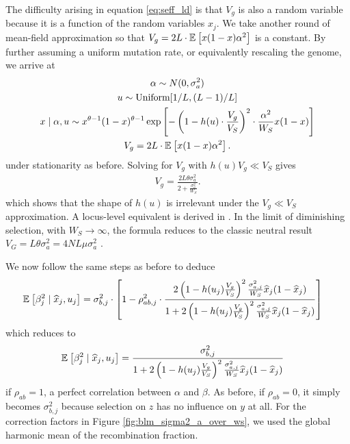 \documentclass[10pt]{article}
\begin{document}
The difficulty arising in equation \eqref{eq:seff_ld} is that $V_g$ is also a random variable because it is a function of the random variables $x_j$.
We take another round of mean-field approximation so that $V_g = 2L \cdot \mathbb{E}_{}\left[x(1-x)\alpha^2\right]$ is a constant.
By further assuming a uniform mutation rate, or equivalently rescaling the genome,
we arrive at
\begin{gather}
    \begin{gathered}
        \alpha \sim N(0, \sigma_a^2) \\
        u \sim \mathrm{Uniform}[1/L,(L-1)/L] \\
        x \mid \alpha, u \sim x^{\theta-1}(1-x)^{\theta-1}
        \exp\left[
            - \left(
            1- h(u) \cdot \frac{V_g}{V_S}
            \right)^2 \cdot 
            \frac{\alpha^2}{W_S}
            x(1-x)
        \right] \\
        V_g = 2L \cdot \mathbb{E}_{}\left[x(1-x)\alpha^2\right].
    \end{gathered}
\end{gather}
under stationarity as before.
Solving for $V_g$ with $h(u) V_g \ll V_S$ gives
\begin{align}
    V_g = \frac{2L\theta \sigma_a^2}{2 + \frac{\sigma_a^2}{W_S}}.
\end{align}
which shows that the shape of $h(u)$ is irrelevant under the $V_g \ll V_S$ approximation.
A locus-level equivalent is derived in \citet{Keightley_1988}.
In the limit of diminishing selection, with $W_S \rightarrow \infty$, the formula reduces to the classic neutral result $V_G = L\theta\sigma_a^2 = 4NL\mu\sigma_a^2$ \citep{Lynch_1986}.

We now follow the same steps as before to deduce
\begin{align} \label{eq:arch_final}
    \begin{aligned}
        \mathbb{E}_{}\left[\beta_j^2 \mid \widehat{x}_j, u_j\right]
    &= \sigma_{b,j}^2 \cdot 
    \left[
    1 - 
    \rho_{ab,j}^2 \cdot 
        \frac{
             2\left(1-h(u_j)\frac{V_g}{V_S}\right)^2\frac{\sigma_{a,j}^2}{W_S} \widehat{x}_j(1-\widehat{x}_j)}{
            1 + 2\left(1-h(u_j)\frac{V_g}{V_S}\right)^2\frac{\sigma_{a,j}^2}{W_S} \widehat{x}_j(1-\widehat{x}_j) 
        }
    \right]
    \end{aligned}
\end{align}
which reduces to
\begin{align}
    \begin{aligned}
        \mathbb{E}_{}\left[\beta_j^2 \mid \widehat{x}_j, u_j\right]
    &=   
        \frac{
        \sigma_{b,j}^2
             }{
            1 + 2\left(1-h(u_j)\frac{V_g}{V_S}\right)^2\frac{\sigma_{a,j}^2}{W_S} \widehat{x}_j(1-\widehat{x}_j) 
        }
    \end{aligned}
\end{align}
if $\rho_{ab}=1$, a perfect correlation between $\alpha$ and $\beta$.
As before, if $\rho_{ab}=0$, it simply becomes $\sigma_{b,j}^2$ because selection on $z$ has no influence on $y$ at all.
For the correction factors in Figure \ref{fig:blm_sigma2_a_over_ws}, we used the global harmonic mean of the recombination fraction.
\end{document}
